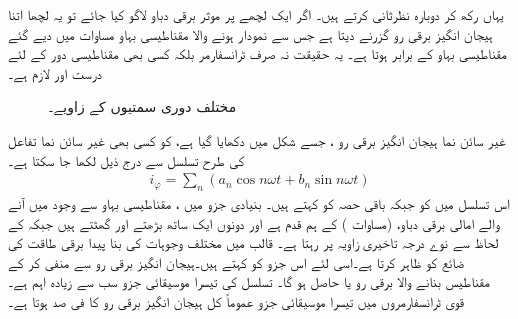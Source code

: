 یہاں رکھ کر دوبارہ نظرثانی کرتے ہیں۔ اگر ایک  لچھے پر  موثر برقی دباو لاگو کیا جائے تو یہ لچھا اتنا ہیجان انگیز برقی رو  گزرنے دیتا ہے جس سے نمودار ہونے والا مقناطیسی بہاو مساوات   میں دیے گئے مقناطیسی بہاو  کے برابر ہوتا ہے۔ یہ حقیقت  نہ صرف ٹرانسفارمر بلکہ کسی بھی مقناطیسی دور کے لئے درست اور لازم ہے۔
\begin{figure}
\centering
\caption{مختلف دوری سمتیوں کے زاویے۔}
\label{شکل_ٹرانسفارمر_مرکزی_ضیاع_اور_مقناطیسی_رو}
\end{figure}

غیر سائن نما ہیجان انگیز برقی رو ، جسے شکل  میں دکھایا گیا ہے،  کو کسی بھی غیر سائن نما تفاعل کی طرح   تسلسل سے درج ذیل لکھا جا سکتا ہے۔
\begin{align} \label{مساوات_ٹرانسفارمر_فوریئر_تسلسل_رو}
i_{\varphi}=\sum_n {\left( a_n \cos n \omega t + b_n \sin n\omega t \right)}
\end{align}
اس تسلسل میں  کو   جبکہ باقی حصہ کو    کہتے ہیں۔ بنیادی جزو میں ، مقناطیسی بہاو سے وجود میں آنے والے امالی برقی دباو،   (مساوات )  کے ہم قدم ہے اور  دونوں ایک ساتھ بڑھتے اور گھٹتے ہیں جبکہ   کے لحاظ سے  نوے درجہ تاخیری  زاویہ  پر رہتا ہے۔ قالب میں مختلف وجوہات کی بنا پیدا برقی طاقت کی ضائع  کو  ظاہر  کرتا ہے۔اسی لئے اس جزو کو   کہتے ہیں۔ہیجان انگیز برقی رو  سے  منفی کر کے مقناطیس بنانے والا برقی رو یا
 حاصل ہو گا۔ تسلسل  کی تیسرا موسیقائی جزو سب سے زیادہ اہم  ہے۔ قوی  ٹرانسفارمروں میں  تیسرا موسیقائی جزو عموماً  کل ہیجان انگیز برقی رو  کا  فی صد ہوتا ہے۔  

